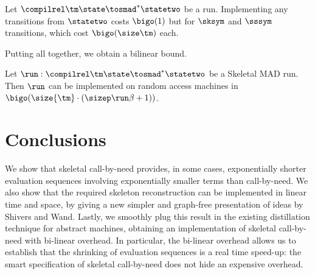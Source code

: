 \begin{lemma}
  Let $\compilrel\tm\state \tosmad^*\statetwo$ be a run. Implementing any transitions from $\statetwo$ costs $\bigo(1)$ but for $\sksym$ and $\sssym$ transitions, which cost $\bigo(\size\tm)$ each.
\end{lemma}

Putting all together, we obtain a bilinear bound.
\begin{theorem}
\label{thm:SkMAD-is-bilinear}
Let $\run: \compilrel\tm\state \tosmad^*\statetwo$ be a Skeletal MAD run. Then $\run$ can be implemented on random access machines in $\bigo(\size{\tm}\cdot(\sizep\run\beta +1))$.
\end{theorem}


\section{Conclusions}
\label{sect:conclusions}

We show that skeletal call-by-need provides, in some cases, exponentially shorter evaluation sequences involving exponentially smaller terms than call-by-need. We also show that the required skeleton reconstruction can be implemented in linear time and space, by giving a new simpler and graph-free presentation of ideas by Shivers and Wand. Lastly, we smoothly plug this result in the existing distillation technique for abstract machines, obtaining an implementation of skeletal call-by-need with bi-linear overhead. In particular, the bi-linear overhead allows us to establish that the shrinking of evaluation sequences is a real time speed-up: the smart specification of skeletal call-by-need does not hide an expensive overhead.































\appendix
{}

